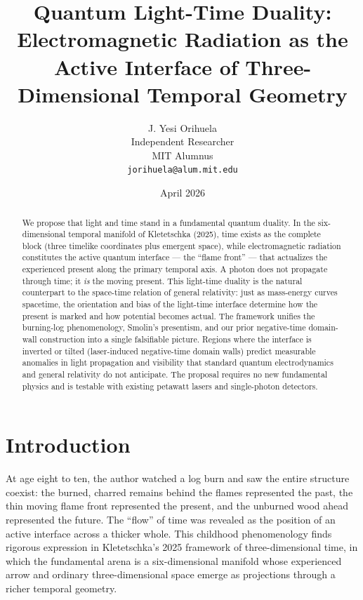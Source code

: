 \documentclass[11pt,a4paper]{article}
\begin{document}
\title{\textbf{Quantum Light-Time Duality: \\ Electromagnetic Radiation as the Active Interface of Three-Dimensional Temporal Geometry}}

\author{J. Yesi Orihuela \\
\small Independent Researcher \\
\small MIT Alumnus \\
\small \texttt{jorihuela@alum.mit.edu}}

\date{April 2026}

\maketitle

\begin{abstract}
We propose that light and time stand in a fundamental quantum duality. In the six-dimensional temporal manifold of Kletetschka (2025), time exists as the complete block (three timelike coordinates plus emergent space), while electromagnetic radiation constitutes the active quantum interface — the ``flame front'' — that actualizes the experienced present along the primary temporal axis. A photon does not propagate through time; it \textit{is} the moving present. This light-time duality is the natural counterpart to the space-time relation of general relativity: just as mass-energy curves spacetime, the orientation and bias of the light-time interface determine how the present is marked and how potential becomes actual. The framework unifies the burning-log phenomenology, Smolin's presentism, and our prior negative-time domain-wall construction into a single falsifiable picture. Regions where the interface is inverted or tilted (laser-induced negative-time domain walls) predict measurable anomalies in light propagation and visibility that standard quantum electrodynamics and general relativity do not anticipate. The proposal requires no new fundamental physics and is testable with existing petawatt lasers and single-photon detectors.
\end{abstract}

\section{Introduction}

At age eight to ten, the author watched a log burn and saw the entire structure coexist: the burned, charred remains behind the flames represented the past, the thin moving flame front represented the present, and the unburned wood ahead represented the future. The “flow” of time was revealed as the position of an active interface across a thicker whole. This childhood phenomenology finds rigorous expression in Kletetschka's 2025 framework of three-dimensional time, in which the fundamental arena is a six-dimensional manifold whose experienced arrow and ordinary three-dimensional space emerge as projections through a richer temporal geometry.
\end{document}
